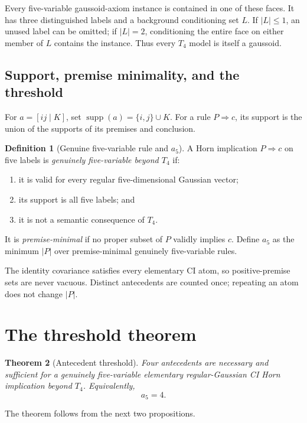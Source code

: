 \documentclass[10pt]{article}
\newtheorem{theorem}{Theorem}[section]
\theoremstyle{definition}
\newtheorem{definition}[theorem]{Definition}
\newcommand{\Tfour}{T_4}
\newcommand{\supp}{\operatorname{supp}}
\begin{document}
Every five-variable gaussoid-axiom instance is contained in one of these faces.  It has three distinguished labels and a background conditioning set $L$.  If $|L|\le1$, an unused label can be omitted; if $|L|=2$, conditioning the entire face on either member of $L$ contains the instance.  Thus every $\Tfour$ model is itself a gaussoid.

\subsection{Support, premise minimality, and the threshold}

For $a=[ij\mid K]$, set $\supp(a)=\{i,j\}\cup K$.  For a rule $P\Rightarrow c$, its support is the union of the supports of its premises and conclusion.

\begin{definition}[Genuine five-variable rule and $a_5$]\label{def:a5}
A Horn implication $P\Rightarrow c$ on five labels is \emph{genuinely five-variable beyond $\Tfour$} if:
\begin{enumerate}
 \item it is valid for every regular five-dimensional Gaussian vector;
 \item its support is all five labels; and
 \item it is not a semantic consequence of $\Tfour$.
\end{enumerate}
It is \emph{premise-minimal} if no proper subset of $P$ validly implies $c$.  Define $a_5$ as the minimum $|P|$ over premise-minimal genuinely five-variable rules.
\end{definition}

The identity covariance satisfies every elementary CI atom, so positive-premise sets are never vacuous.  Distinct antecedents are counted once; repeating an atom does not change $|P|$.

\section{The threshold theorem}\label{sec:main}

\begin{theorem}[Antecedent threshold]\label{thm:main}
Four antecedents are necessary and sufficient for a genuinely five-variable elementary regular-Gaussian CI Horn implication beyond $\Tfour$.  Equivalently,
\[
 \boxed{a_5=4}.
\]
\end{theorem}

The theorem follows from the next two propositions.
\end{document}
